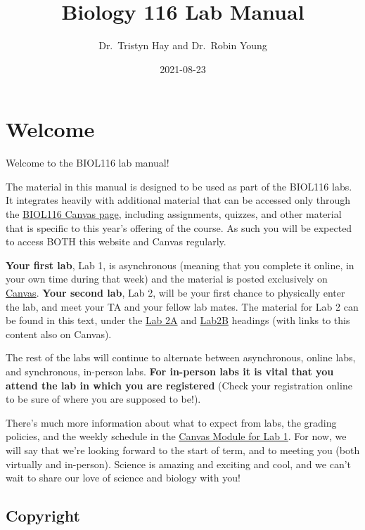 \documentclass[
]{book}
\title{Biology 116 Lab Manual}
\author{Dr.~Tristyn Hay and Dr.~Robin Young}
\date{2021-08-23}
\begin{document}
\maketitle

{
\setcounter{tocdepth}{1}
\tableofcontents
}
\hypertarget{welcome}{%
\chapter*{Welcome}\label{welcome}}

Welcome to the BIOL116 lab manual!

The material in this manual is designed to be used as part of the BIOL116 labs. It integrates heavily with additional material that can be accessed only through the \href{https://canvas.ubc.ca/courses/90147}{BIOL116 Canvas page}, including assignments, quizzes, and other material that is specific to this year's offering of the course. As such you will be expected to access BOTH this website and Canvas regularly.

\textbf{Your first lab}, Lab 1, is asynchronous (meaning that you complete it online, in your own time during that week) and the material is posted exclusively on \href{https://canvas.ubc.ca/courses/90147}{Canvas}. \textbf{Your second lab}, Lab 2, will be your first chance to physically enter the lab, and meet your TA and your fellow lab mates. The material for Lab 2 can be found in this text, under the \href{https://ubco-biology.github.io/BIOL-116-Lab-Manual/lab-2a-the-process-of-science.html}{Lab 2A} and \href{https://ubco-biology.github.io/BIOL-116-Lab-Manual/lab-2b-research-project.html}{Lab2B} headings (with links to this content also on Canvas).

The rest of the labs will continue to alternate between asynchronous, online labs, and synchronous, in-person labs. \textbf{For in-person labs it is vital that you attend the lab in which you are registered} (Check your registration online to be sure of where you are supposed to be!).

There's much more information about what to expect from labs, the grading policies, and the weekly schedule in the \href{https://canvas.ubc.ca/courses/90147}{Canvas Module for Lab 1}. For now, we will say that we're looking forward to the start of term, and to meeting you (both virtually and in-person). Science is amazing and exciting and cool, and we can't wait to share our love of science and biology with you!

\hypertarget{copyright}{%
\section*{Copyright}\label{copyright}}
\end{document}
